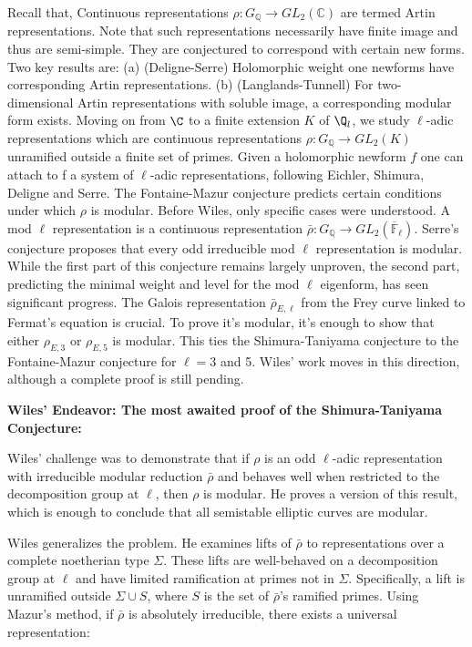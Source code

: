 Recall that, Continuous representations \( \rho: G_{\mathbb{Q}} \rightarrow G L_{2}(\mathbb{C}) \) are termed Artin representations. Note that such representations necessarily have finite image and thus are semi-simple. They are conjectured to correspond with certain new forms. Two key results are:
(a) (Deligne-Serre) Holomorphic weight one newforms have corresponding Artin representations.
(b) (Langlands-Tunnell) For two-dimensional Artin representations with soluble image, a corresponding modular form exists. Moving on from $\C$ to a finite extension $K$ of $\Q_l$, we study \( \ell \)-adic representations which are continuous representations \( \rho: G_{\mathbb{Q}} \rightarrow G L_{2}(K) \) unramified outside a finite set of  primes. Given a holomorphic newform $f$ one can attach to f a system of $\ell$-adic representations, following Eichler, Shimura, Deligne and Serre. The Fontaine-Mazur conjecture predicts certain conditions under which \( \rho \) is modular. Before Wiles, only specific cases were understood. A mod \( \ell \) representation is a continuous representation \( \bar{\rho}: G_{\mathbb{Q}} \rightarrow G L_{2}\left(\overline{\mathbb{F}}_{\ell}\right) \). Serre's conjecture proposes that every odd irreducible mod \( \ell \) representation is modular. While the first part of this conjecture remains largely unproven, the second part, predicting the minimal weight and level for the mod \( \ell \) eigenform, has seen significant progress. The Galois representation \( \bar{\rho}_{E, \ell} \) from the Frey curve linked to Fermat's equation is crucial. To prove it's modular, it's enough to show that either \( \rho_{E, 3} \) or \( \rho_{E, 5} \) is modular. This ties the Shimura-Taniyama conjecture to the Fontaine-Mazur conjecture for \( \ell=3 \) and 5. Wiles' work moves in this direction, although a complete proof is still pending.

\begin{center}
\textbf{Wiles’ Endeavor: The most awaited proof of the Shimura-Taniyama Conjecture:}    
\end{center}


Wiles' challenge was to demonstrate that if \( \rho \) is an odd \( \ell \)-adic representation with irreducible modular reduction \( \bar{\rho} \) and behaves well when restricted to the decomposition group at \( \ell \), then \( \rho \) is modular. He proves a version of this result, which is enough to conclude that all semistable elliptic curves are modular.

Wiles generalizes the problem. He examines lifts of \( \bar{\rho} \) to representations over a complete noetherian type \( \Sigma \). These lifts are well-behaved on a decomposition group at \( \ell \) and have limited ramification at primes not in \( \Sigma \). Specifically, a lift is unramified outside \( \Sigma \cup S \), where \( S \) is the set of \( \bar{\rho} \)'s ramified primes. Using Mazur's method, if \( \bar{\rho} \) is absolutely irreducible, there exists a universal representation:


